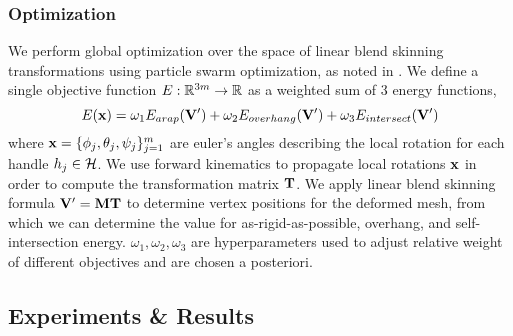 







\subsubsection*{Optimization}

We perform global optimization over the space of linear blend skinning transformations using particle swarm optimization, as noted in \cite{jacobson_matryoshka_2017}. We define a single objective function $E: \mathbb{R}^{3m} \to \mathbb{R}$ as a weighted sum of 3 energy functions,
\[
    E(\mathbf{x}) = \omega_1 E_{arap}(\mathbf{V}') + \omega_2 E_{overhang}(\mathbf{V}') + \omega_3 E_{intersect}(\mathbf{V}')
\]
where $\mathbf{x} = \{ \phi_j, \theta_j, \psi_j \}_{j=1}^m$ are euler's angles describing the local rotation for each handle $h_j \in \mathcal{H}$. We use forward kinematics to propagate local rotations $\mathbf{x}$ in order to compute the transformation matrix $\mathbf{T}$. We apply linear blend skinning formula $\mathbf{V}' = \mathbf{M} \mathbf{T}$ to determine vertex positions for the deformed mesh, from which we can determine the value for as-rigid-as-possible, overhang, and self-intersection energy. $\omega_1,\omega_2,\omega_3$ are hyperparameters used to adjust relative weight of different objectives and are chosen a posteriori.

\subsection*{Experiments \& Results}

